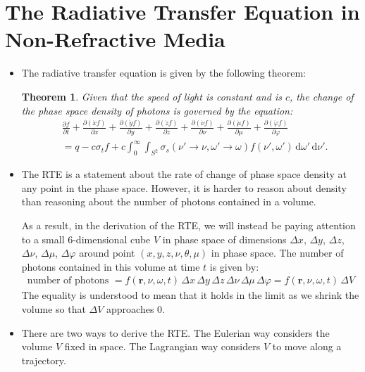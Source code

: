\documentclass[10pt]{article}
\newtheorem{theorem}[lemma]{Theorem}
\newcommand{\dee}{\mathrm{d}}
\newcommand{\ve}[1]{\mathbf{#1}}
\newcommand{\ra}{\rightarrow}
\begin{document}
  \section{The Radiative Transfer Equation in Non-Refractive Media}
  \begin{itemize}
    \item The radiative transfer equation is given by the following theorem:
    \begin{theorem} \label{basic-rte}
      Given that the speed of light is constant and is $c$,
      the change of the phase space density of photons is governed by the equation:
      \begin{align*}
        & \frac{\partial f}{\partial t}  
        + \frac{\partial (\dot x f)}{\partial x}
        + \frac{\partial (\dot y f)}{\partial y}
        + \frac{\partial (\dot z f)}{\partial z}
        + \frac{\partial (\dot \nu f)}{\partial \nu}
        + \frac{\partial (\dot \mu f)}{\partial \mu}
        + \frac{\partial (\dot \varphi f)}{\partial \varphi} \\
        &= q -c \sigma_t f
        +c \int_{0}^\infty \int_{S^2} \sigma_s(\nu' \ra \nu, \omega' \ra \omega) f(\nu', \omega')\, \dee \omega'\, \dee \nu'.
      \end{align*}      
    \end{theorem}
    
    \item The RTE is a statement about the rate of change of phase space density at any point in the phase space. However, it is harder to reason about density than reasoning about the number of photons contained in a volume. 

    As a result, in the derivation of the RTE, we will instead be paying attention to a small 6-dimensional cube $V$ in phase space of dimensions $\Delta x$, $\Delta y$, $\Delta z$, $\Delta \nu$, $\Delta \mu$, $\Delta \varphi$ around point $(x, y, z, \nu, \theta, \mu)$ in phase space. The number of photons contained in this volume at time $t$ is given by:
    \begin{align*}
      \mbox{number of photons } = f(\ve{r}, \nu, \omega, t)\, \Delta x\, \Delta y\, \Delta z\, \Delta \nu\, \Delta \mu\, \Delta \varphi
      = f(\ve{r}, \nu, \omega, t)\, \Delta V
    \end{align*}
    The equality is understood to mean that it holds in the limit as we shrink the volume so that $\Delta V$ approaches $0$.
    
    \item There are two ways to derive the RTE. The Eulerian way considers the volume $V$ fixed in space. The Lagrangian way considers $V$ to move along a trajectory. 

  \end{itemize}
\end{document}
